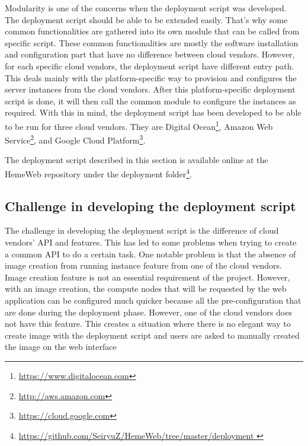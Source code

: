 Modularity is one of the concerns when the deployment script was developed. The deployment script should be able to be extended easily. That's why some common functionalities are gathered into its own module that can be called from specific script. These common functionalities are mostly the software installation and configuration part that have no difference between cloud vendors. However, for each specific cloud vendors, the deployment script have different entry path. This deals mainly with the platform-specific way to provision and configures the server instances from the cloud vendors. After this platform-specific deployment script is done, it will then call the common module to configure the instances as required. With this in mind, the deployment script has been developed to be able to be run for three cloud vendors. They are Digital Ocean\footnote{\url{https://www.digitalocean.com}}, Amazon Web Service\footnote{\url{http://aws.amazon.com}}, and Google Cloud Platform\footnote{\url{https://cloud.google.com}}.

The deployment script described in this section is available online at the HemeWeb repository under the deployment folder\footnote{\url{https://github.com/SeiryuZ/HemeWeb/tree/master/deployment }}.

\subsection{Challenge in developing the deployment script}
The challenge in developing the deployment script is the difference of cloud vendors' API and features.  This has led to some problems when trying to create a common API to do a certain task. One notable problem is that the absence of image creation from running instance feature from one of the cloud vendors. Image creation feature is not an essential requirement of the project. However, with an image creation, the compute nodes that will be requested by the web application can be configured much quicker because all the pre-configuration that are done during the deployment phase. However, one of the cloud vendors does not have this feature. This creates a situation where there is no elegant way to create image with the deployment script and users are asked to manually created the image on the web interface

\vspace{1cm}

